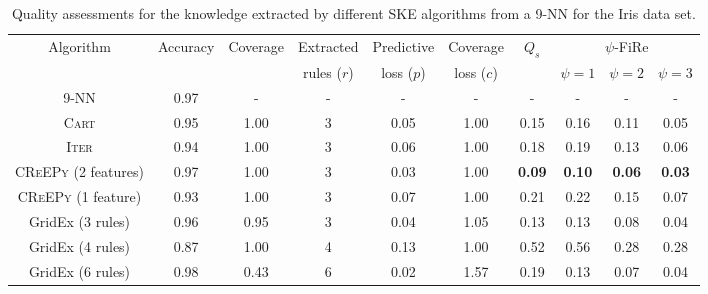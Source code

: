 \documentclass{article}
\newcommand{\iter}{\textsc{Iter}}
\newcommand{\gridex}{GridEx}
\newcommand{\creepy}{\textsc{CReEPy}}
\newcommand{\cart}{\textsc{Cart}}
\newcommand{\fire}{FiRe}
\newcommand{\psifire}{$\psi$-\fire}
\begin{document}
\begin{table}[t]\centering
	\begin{tabular}{|c||c|c|c|c|c||c|c|c|c|}
		\toprule
		Algorithm & Accuracy & Coverage & Extracted & Predictive & Coverage & $Q_s$ & \multicolumn{3}{c|}{\psifire{}} \\
		& & & rules ($r$) & loss ($p$) & loss ($c$) & & $\psi=1$ & $\psi=2$ & $\psi=3$ \\
		\midrule\midrule
		9-NN & 0.97 & - & - & - & - & - & - & - & - \\
		\midrule
		\cart{} & 0.95 & 1.00 & 3 & 0.05 & 1.00 & 0.15 & 0.16 & 0.11 & 0.05 \\
		\iter{} & 0.94 & 1.00 & 3 & 0.06 & 1.00 & 0.18 & 0.19 & 0.13 & 0.06 \\
		\creepy{} (2 features) & 0.97 & 1.00 & 3 & 0.03 & 1.00 & \textbf{0.09} & \textbf{0.10} & \textbf{0.06} & \textbf{0.03} \\
		\creepy{} (1 feature) & 0.93 & 1.00 & 3 & 0.07 & 1.00 & 0.21 & 0.22 & 0.15 & 0.07 \\
		\gridex{} (3 rules) & 0.96 & 0.95 & 3 & 0.04 & 1.05 & 0.13 & 0.13 & 0.08 & 0.04 \\
		\gridex{} (4 rules) & 0.87 & 1.00 & 4 & 0.13 & 1.00 & 0.52 & 0.56 & 0.28 & 0.28 \\
		\gridex{} (6 rules) & 0.98 & 0.43 & 6 & 0.02 & 1.57 & 0.19 & 0.13 & 0.07 & 0.04 \\
		\bottomrule
	\end{tabular}
	\caption{Quality assessments for the knowledge extracted by different SKE algorithms from a 9-NN for the Iris data set.}
	\label{tab:experiments}
\end{table}
\end{document}
